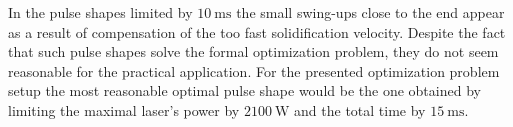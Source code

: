 In the pulse shapes limited by $\SI{10}{\ms}$ the small swing-ups close to the end appear as a result of compensation of the too fast solidification velocity. Despite the fact that such pulse shapes solve the formal optimization problem, they do not seem reasonable for the practical application. For the presented optimization problem setup the most reasonable optimal pulse shape would be the one obtained by limiting the maximal laser's power by $\SI{2100}{\W}$ and the total time by $\SI{15}{\ms}$.

